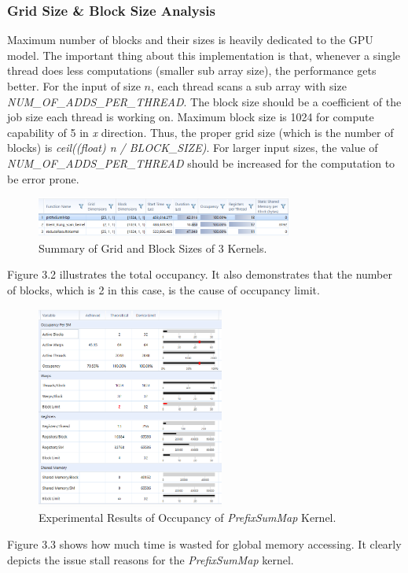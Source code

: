 \documentclass[12pt]{article}
\numberwithin{equation}{section}
\numberwithin{table}{section}
\numberwithin{figure}{section}
\begin{document}
\subsubsection{Grid Size \& Block Size Analysis}
Maximum number of blocks and their sizes is heavily dedicated to the GPU model. The important thing about this implementation is that, whenever a single thread does less computations (smaller sub array size), the performance gets better. For the input of size $n$, each thread scans a sub array with size \textit{NUM\_OF\_ADDS\_PER\_THREAD}. The block size should be a coefficient of the job size each thread is working on. Maximum block size is 1024 for compute capability of 5 in \textit{x} direction. Thus, the proper grid size (which is the number of blocks) is \textit{ceil((float) n / BLOCK\_SIZE)}. For larger input sizes, the value of \textit{NUM\_OF\_ADDS\_PER\_THREAD} should be increased for the computation to be error prone.
\begin{figure}[!h]\centering
	\includegraphics[width=0.75\textwidth]{3_1.png}
	\caption{Summary of Grid and Block Sizes of 3 Kernels.}
	\label{pl1}
\end{figure}
Figure 3.2 illustrates the total occupancy. It also demonstrates that the number of blocks, which is 2 in this case, is the cause of occupancy limit.
\begin{figure}[!h]\centering
	\includegraphics[width=0.55\textwidth]{3_2.png}
	\caption{Experimental Results of Occupancy of \textit{PrefixSumMap} Kernel.}
	\label{pl1}
\end{figure}
\newpage
Figure 3.3 shows how much time is wasted for global memory accessing. It clearly depicts the issue stall reasons for the \textit{PrefixSumMap} kernel.
\end{document}
